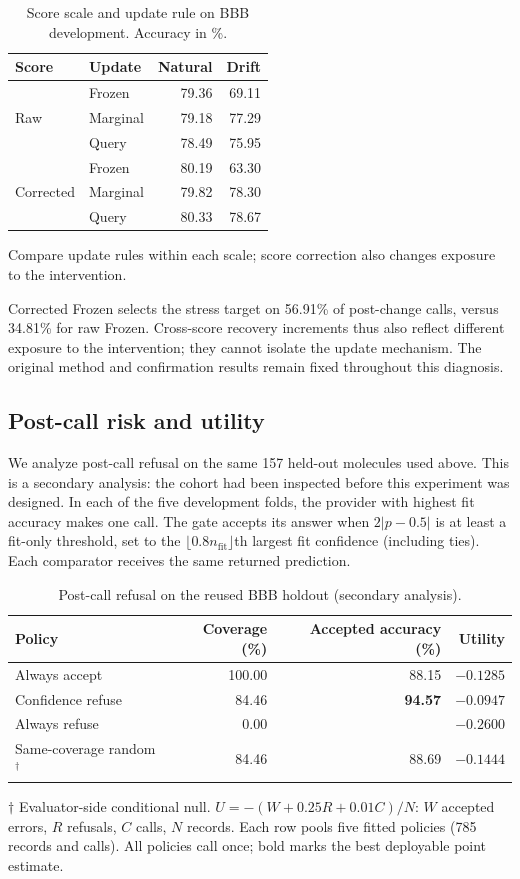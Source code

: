\documentclass[sigconf,anonymous]{aamas}
\makeatletter
\newcommand{\MiraTableFont}{\fontsize{9}{11}\selectfont}
\newcommand{\tnote}[1]{{\fontsize{8.5}{10}\selectfont\raggedright\par\vspace{3pt}#1\par}}
\newcommand{\notrun}{\textemdash}
\newcommand{\MiraCenterCaption}{Score scale and update rule on BBB development. Accuracy in \%.}
\newcommand{\MiraCenterLabels}{\label{tab:centering-diagnostic}}
\newcommand{\MiraCenterBody}{%
\begingroup\centering\MiraTableFont\setlength{\tabcolsep}{6pt}\renewcommand{\arraystretch}{1.08}
\begin{tabular}{@{}llrr@{}}
\toprule
Score & Update & Natural & Drift \\
\midrule
\multirow{3}{*}{Raw} & Frozen & 79.36 & 69.11 \\
& Marginal & 79.18 & 77.29 \\
& Query & 78.49 & 75.95 \\
\midrule
\multirow{3}{*}{Corrected} & Frozen & 80.19 & 63.30 \\
& Marginal & 79.82 & 78.30 \\
& Query & 80.33 & 78.67 \\
\bottomrule
\end{tabular}\par
\tnote{Compare update rules within each scale; score correction also changes exposure to the intervention.}
\endgroup}
\makeatother
\begin{document}
\begin{table}[t]
\caption{\MiraCenterCaption}
\MiraCenterLabels
\MiraCenterBody
\end{table}

Corrected Frozen selects the stress target on 56.91\% of post-change calls, versus 34.81\% for raw Frozen. Cross-score recovery increments thus also reflect different exposure to the intervention; they cannot isolate the update mechanism. The original method and confirmation results remain fixed throughout this diagnosis.


\subsection{Post-call risk and utility}
We analyze post-call refusal on the same 157 held-out molecules used above. This is a secondary analysis: the cohort had been inspected before this experiment was designed. In each of the five development folds, the provider with highest fit accuracy makes one call. The gate accepts its answer when $2|p-0.5|$ is at least a fit-only threshold, set to the $\lfloor0.8n_{\mathrm{fit}}\rfloor$th largest fit confidence (including ties). Each comparator receives the same returned prediction.

\begin{table}[t]
\caption{Post-call refusal on the reused BBB holdout (secondary analysis).}
\label{tab:postcall-verification}\label{tab:postcall}
\begingroup\centering\MiraTableFont\setlength{\tabcolsep}{14pt}\renewcommand{\arraystretch}{1.08}
\begin{tabular}{@{}lrrr@{}}
\toprule
Policy & Coverage (\%) & Accepted accuracy (\%) & Utility \\
\midrule
Always accept & 100.00 & 88.15 & $-0.1285$ \\
Confidence refuse & 84.46 & \textbf{94.57} & $\mathbf{-0.0947}$ \\
Always refuse & 0.00 & \notrun & $-0.2600$ \\
\midrule
Same-coverage random$^{\dagger}$ & 84.46 & 88.69 & $-0.1444$ \\
\bottomrule
\end{tabular}\par
\tnote{$\dagger$ Evaluator-side conditional null. $U=-(W+0.25R+0.01C)/N$: $W$ accepted errors, $R$ refusals, $C$ calls, $N$ records. Each row pools five fitted policies (785 records and calls). All policies call once; bold marks the best deployable point estimate.}
\endgroup
\end{table}
\end{document}
